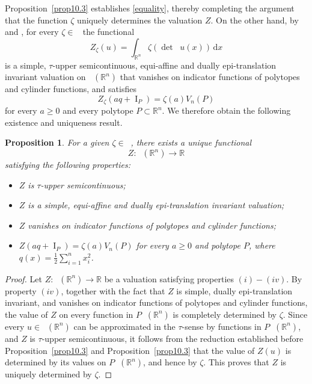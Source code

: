 \documentclass[11pt]{article}
\newtheorem{prop}[teo]{Proposition}
\theoremstyle{definition} %
\newcommand{\RR}{(\mathbb{R}^n)}
\DeclareMathOperator{\I}{I}
\DeclareMathOperator{\LQ}{_{l.q}}
\DeclareMathOperator{\D}{D^2}
\DeclareMathOperator{\LP}{Conv_{lp}}
\DeclareMathOperator{\conc}{Conc([0,\infty))}
\begin{document}
Proposition~\ref{prop10.3} establishes \eqref{equality}, thereby completing the argument that the function $\zeta$ uniquely determines the valuation $Z$. 
On the other hand, by \cite[Theorem~1]{baetaludwigsemicontinuity} and \cite[Lemma~12]{baeta1d}, for every $\zeta\in\conc$ the functional
\[
Z_\zeta(u)=\int_{\mathbb{R}^n}\zeta(\det \D u(x))\,\mathrm{d}x
\]
is a simple, $\tau$-upper semicontinuous, equi-affine and dually epi-translation invariant valuation on $\LP(\mathbb{R}^n)$ that vanishes on indicator functions of polytopes and cylinder functions, and satisfies
\[
Z_\zeta(aq+\I_P)=\zeta(a)V_n(P)
\]
for every $a\ge0$ and every polytope $P\subset\mathbb{R}^n$. We therefore obtain the following existence and uniqueness result.


\begin{prop}\label{uniquen}
For a given $\zeta \in \conc$, there exists a unique functional 
$$
Z: \LP(\mathbb{R}^n)\rightarrow\mathbb{R}
$$ 
satisfying the following properties:
\begin{itemize}
    \item[(i)] $Z$ is $\tau$-upper semicontinuous;
    \item[(ii)] $Z$ is a simple, equi-affine and dually epi-translation invariant valuation; 
    \item[(iii)] $Z$  vanishes on indicator functions of polytopes and cylinder functions;
    \item[(iv)] $Z(aq+\I_P)= \zeta(a)V_n(P)$ for every $a \geq 0$ 
    and  polytope $P$, where $q(x)=\frac{1}{2}\sum_{i=1}^n x_i^2$.
\end{itemize}
\end{prop}

\begin{proof}
Let $Z:\LP\RR\rightarrow\mathbb{R}$ be a valuation satisfying properties $(i)-(iv)$.  By property $(iv)$, together with the fact that $Z$ is simple, dually epi-translation invariant, and vanishes on indicator functions of polytopes and cylinder functions, the value of $Z$ on every function in $P\LQ\RR$ is completely determined by $\zeta$. Since every $u\in\LP\RR$ can be approximated in the $\tau$-sense by functions in $P\LQ\RR$, and $Z$ is $\tau$-upper semicontinuous, it follows from the reduction established before Proposition~\ref{prop10.3} and Proposition~\ref{prop10.3} that the value of $Z(u)$ is determined by its values on $P\LQ\RR$, and hence by $\zeta$. This proves that $Z$ is uniquely determined by $\zeta$.
\end{proof}
\end{document}

